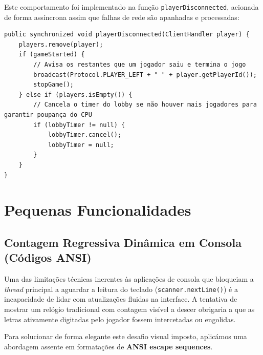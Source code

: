 \documentclass[11pt,a4paper,oneside]{report}
\begin{document}
Este comportamento foi implementado na função \texttt{playerDisconnected}, acionada de forma assíncrona assim que falhas de rede são apanhadas e processadas:

\begin{lstlisting}[caption={Tratamento de desconexões do servidor para com os jogadores}]
public synchronized void playerDisconnected(ClientHandler player) {
    players.remove(player);
    if (gameStarted) {
        // Avisa os restantes que um jogador saiu e termina o jogo
        broadcast(Protocol.PLAYER_LEFT + " " + player.getPlayerId());
        stopGame();
    } else if (players.isEmpty()) {
        // Cancela o timer do lobby se não houver mais jogadores para garantir poupança do CPU
        if (lobbyTimer != null) {
            lobbyTimer.cancel();
            lobbyTimer = null;
        }
    }
}
\end{lstlisting}

\section{Pequenas Funcionalidades}

\subsection{Contagem Regressiva Dinâmica em Consola (Códigos ANSI)}
Uma das limitações técnicas inerentes às aplicações de consola que bloqueiam a \textit{thread} principal a aguardar a leitura do teclado (\texttt{scanner.nextLine()}) é a incapacidade de lidar com atualizações fluidas na interface. A tentativa de mostrar um relógio tradicional com contagem visível a descer obrigaria a que as letras ativamente digitadas pelo jogador fossem intercetadas ou engolidas.

Para solucionar de forma elegante este desafio visual imposto, aplicámos uma abordagem assente em formatações de \textbf{ANSI escape sequences}.
\end{document}
